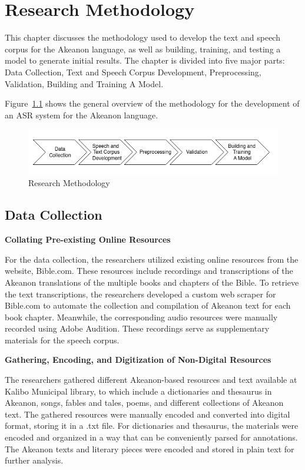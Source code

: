 \chapter{Research Methodology}
This chapter discusses the methodology used to develop the text and speech corpus for the Akeanon language, as well as building, training, and testing a model to generate initial results. The chapter is divided into five major parts: Data Collection, Text and Speech Corpus Development, Preprocessing, Validation, Building and Training A Model.

Figure~\ref{fig:flowchart} shows the general overview of the methodology for the development of an ASR system for the Akeanon language.

\begin{figure}[h!]
	\centering
	\includegraphics[width=\textwidth]{./figures/flowchart.png}
   \caption{Research Methodology}
	\label{fig:flowchart}
\end{figure}


\section{Data Collection}

\textbf{Collating Pre-existing Online Resources}

For the data collection, the researchers utilized existing online resources from the website, Bible.com. These resources include recordings and transcriptions of the Akeanon translations of the multiple books and chapters of the Bible. To retrieve the text transcriptions, the researchers developed a custom web scraper for Bible.com to automate the collection and compilation of Akeanon text for each book chapter. Meanwhile, the corresponding audio resources were manually recorded using Adobe Audition. These recordings serve as supplementary materials for the speech corpus.

\textbf{Gathering, Encoding, and Digitization of Non-Digital Resources}

The researchers gathered different Akeanon-based resources and text available at Kalibo Municipal library, to which include a dictionaries and thesaurus in Akeanon, songs, fables and tales, poems, and different collections of Akeanon text. The gathered resources were manually encoded and converted into digital format, storing it in a .txt file. For dictionaries and thesaurus, the materials were encoded and organized in a way that can be conveniently parsed for annotations. The Akeanon texts and literary pieces were encoded and stored in plain text for further analysis.

